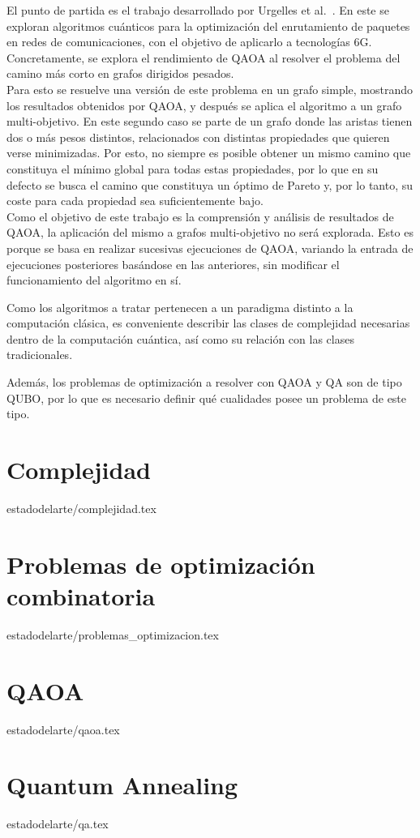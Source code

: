 El punto de partida es el trabajo desarrollado por Urgelles et al.~\cite{multi-objective_routing_optimization}.
En este se exploran algoritmos cuánticos para la optimización del enrutamiento de paquetes en redes de comunicaciones, con el objetivo de aplicarlo a tecnologías 6G.
Concretamente, se explora el rendimiento de QAOA al resolver el problema del camino más corto en grafos dirigidos pesados.
\\
Para esto se resuelve una versión de este problema en un grafo simple, mostrando los resultados obtenidos por QAOA, y después se aplica el algoritmo a un grafo multi-objetivo.
En este segundo caso se parte de un grafo donde las aristas tienen dos o más pesos distintos, relacionados con distintas propiedades que quieren verse minimizadas.
Por esto, no siempre es posible obtener un mismo camino que constituya el mínimo global para todas estas propiedades, por lo que en su defecto se busca el camino que constituya un óptimo de Pareto y, por lo tanto, su coste para cada propiedad sea suficientemente bajo.
\\
Como el objetivo de este trabajo es la comprensión y análisis de resultados de QAOA, la aplicación del mismo a grafos multi-objetivo no será explorada.
Esto es porque se basa en realizar sucesivas ejecuciones de QAOA, variando la entrada de ejecuciones posteriores basándose en las anteriores, sin modificar el funcionamiento del algoritmo en sí.

Como los algoritmos a tratar pertenecen a un paradigma distinto a la computación clásica, es conveniente describir las clases de complejidad necesarias dentro de la computación cuántica, así como su relación con las clases tradicionales.

Además, los problemas de optimización a resolver con QAOA y QA son de tipo QUBO, por lo que es necesario definir qué cualidades posee un problema de este tipo.

\section{Complejidad}{estadodelarte/complejidad.tex}

\section{Problemas de optimización combinatoria\label{sec:2-problemas de optimizacion combinatoria}}{estadodelarte/problemas_optimizacion.tex}

\section{QAOA\label{sec:2-qaoa}}{estadodelarte/qaoa.tex}

\section{Quantum Annealing}{estadodelarte/qa.tex}

